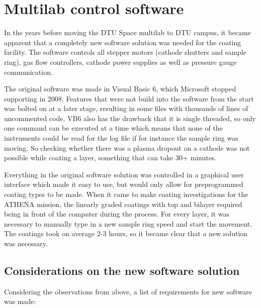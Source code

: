 \section{Multilab control software}\label{sec:ml_software}
In the years before moving the DTU Space multilab to DTU campus, it became apparent that a completely new software solution was needed for the coating facility. The software controls all stepper motors (cathode shutters and sample ring), gas flow controllers,  cathode power supplies as well as pressure gauge communication.

The original software was made in Visual Basic 6, which Microsoft stopped supporting in 2008. Features that were not build into the software from the start was bolted on at a later stage, resulting in some files with thousands of lines of uncommented code. VB6 also has the drawback that it is single threaded, so only one command can be executed at a time which means that none of the instruments could be read for the log file if for instance the sample ring was moving. So checking whether there was a plasma dropout on a cathode was not possible while coating a layer, something that can take 30+ minutes.

Everything in the original software solution was controlled in a graphical user interface which made it easy to use, but would only allow for preprogrammed coating types to be made. When it came to make coating investigations for the ATHENA mission, the linearly graded coatings with top and bilayer required being in front of the computer during the process. For every layer, it was necessary to manually type in a new sample ring speed and start the movement. The coatings took on average 2-3 hours, so it became clear that a new solution was necessary.

\subsection{Considerations on the new software solution}
Considering the observations from above, a list of requirements for new software was made:

